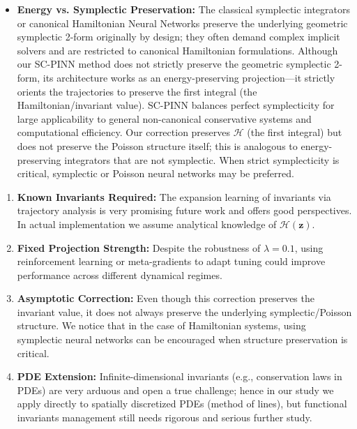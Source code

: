 \documentclass[pdflatex,sn-mathphys-num]{sn-jnl}
\theoremstyle{thmstyleone}%
\theoremstyle{thmstyletwo}%
\theoremstyle{thmstylethree}%
\begin{document}
	\begin{itemize}
		\item \textbf{Energy vs. Symplectic Preservation:} The classical symplectic integrators or canonical Hamiltonian Neural Networks preserve the underlying geometric symplectic 2-form originally by design; they often demand complex implicit solvers and are restricted to canonical Hamiltonian formulations. Although our SC-PINN method does not strictly preserve the geometric symplectic 2-form, its architecture works as an energy-preserving projection---it strictly orients the trajectories to preserve the first integral (the Hamiltonian/invariant value). SC-PINN balances perfect symplecticity for large applicability to general non-canonical conservative systems and computational efficiency. Our correction preserves $\mathcal{H}$ (the first integral) but does not preserve the Poisson structure itself; this is analogous to energy-preserving integrators that are not symplectic. When strict symplecticity is critical, symplectic or Poisson neural networks \cite{zhang2023poisson} may be preferred.
	\end{itemize}
	
	\begin{enumerate}
		\item \textbf{Known Invariants Required:} The expansion learning of invariants via trajectory analysis is very promising future work and offers good perspectives. In actual implementation we assume analytical knowledge of $\mathcal{H}(\mathbf{z})$. 
		\item \textbf{Fixed Projection Strength:} Despite the robustness of $\lambda = 0.1$, using reinforcement learning or meta-gradients to adapt tuning could improve performance across different dynamical regimes. 
		\item \textbf{Asymptotic Correction:} Even though this correction preserves the invariant value, it does not always preserve the underlying symplectic/Poisson structure. We notice that in the case of Hamiltonian systems, using symplectic neural networks can be encouraged when structure preservation is critical.
		
		\item \textbf{PDE Extension:} Infinite-dimensional invariants (e.g., conservation laws in PDEs) are very arduous and open a true challenge; hence in our study we apply directly to spatially discretized PDEs (method of lines), but functional invariants management still needs rigorous and serious further study.
	\end{enumerate}
	
\end{document}
